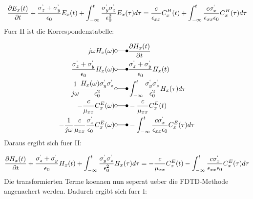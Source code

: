 \documentclass[11pt, ngerman]{article}
\begin{document}
\begin{align}
\frac{\partial E_x(t)}{\partial t} +\frac{\sigma^`_z + \sigma^`_y}{\epsilon_0}E_x(t) + \int_{-\infty}^t\frac{\sigma^`_y\sigma^`_z}{\epsilon_0^2}E_x(\tau)d\tau = \frac{c}{\epsilon_{xx}}C_x^H(t) + \int_{-\infty}^t \frac{c\sigma^`_x}{\epsilon_{xx}\epsilon_0}C_x^H(\tau)d\tau
\end{align}
Fuer II ist die Korrespondenztabelle:

\begin{align}
	j\omega H_x(\omega) &\laplace \frac{\partial H_x(t)}{\partial t}\\
	\frac{\sgma_z + \sgma_y}{\epsilon_0}H_x(\omega) &\laplace \frac{\sgma_z + \sgma_y}{\epsilon_0}H_x(t)\\
	\frac{1}{j\omega}\frac{H_x(\omega)\sgma_y\sgma_z}{\epsilon_0^2} &\laplace \int_{-\infty}^t\frac{\sgma_y\sgma_z}{\epsilon_0^2}H_x(\tau)d\tau\\
	-\frac{c}{\mu_{xx}}C_x^E(\omega) &\laplace -\frac{c}{\mu_{xx}}C_x^E(t)\\
	-\frac{1}{j\omega}\frac{c}{\mu_{xx}}\frac{\sgma_x}{\epsilon_0}C_x^E(\omega) &\laplace -\int_{-\infty}^t \frac{c\sgma_x}{\epsilon_{xx}\epsilon_0}C_x^E(\tau)d\tau\\
\end{align}
Daraus ergibt sich fuer II:

\begin{align}
	\frac{\partial H_x(t)}{\partial t} + \frac{\sigma^`_z + \sigma^`_y}{\epsilon_0}H_x(t) + \int_{-\infty}^t\frac{\sigma^`_y\sigma^`_z}{\epsilon_0^2}H_x(\tau)d\tau = -\frac{c}{\mu_{xx}}C_x^E(t) - \int_{-\infty}^t \frac{c\sigma^`_x}{\epsilon_{xx}\epsilon_0}C_x^E(\tau)d\tau\\
\end{align}
Die transformierten Terme koennen nun seperat ueber die FDTD-Methode angenaehert werden.
Dadurch ergibt sich fuer I:
\end{document}
